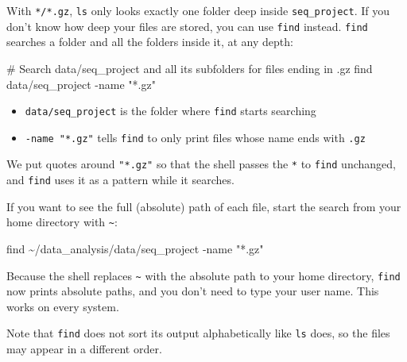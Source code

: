 \documentclass[
  letterpaper,
  DIV=11,
  numbers=noendperiod]{scrreprt}
\newenvironment{Shaded}{}{}
\newcommand{\AttributeTok}[1]{\textcolor[rgb]{0.84,0.23,0.29}{#1}}
\newcommand{\CommentTok}[1]{\textcolor[rgb]{0.42,0.45,0.49}{#1}}
\newcommand{\FunctionTok}[1]{\textcolor[rgb]{0.44,0.26,0.76}{#1}}
\newcommand{\NormalTok}[1]{\textcolor[rgb]{0.14,0.16,0.18}{#1}}
\newcommand{\StringTok}[1]{\textcolor[rgb]{0.01,0.18,0.38}{#1}}
\providecommand{\tightlist}{%
  \setlength{\itemsep}{0pt}\setlength{\parskip}{0pt}}
\begin{document}
\begin{tcolorbox}[enhanced jigsaw, coltitle=black, breakable, titlerule=0mm, colback=white, rightrule=.15mm, bottomrule=.15mm, toprule=.15mm, colframe=quarto-callout-tip-color-frame, colbacktitle=quarto-callout-tip-color!10!white, bottomtitle=1mm, opacitybacktitle=0.6, toptitle=1mm, leftrule=.75mm, arc=.35mm, title=\textcolor{quarto-callout-tip-color}{\faLightbulb}\hspace{0.5em}{Tip: Finding files with find (optional)}, left=2mm, opacityback=0]

With \texttt{*/*.gz}, \texttt{ls} only looks exactly one folder deep
inside \texttt{seq\_project}. If you don't know how deep your files are
stored, you can use \texttt{find} instead. \texttt{find} searches a
folder and all the folders inside it, at any depth:

\begin{Shaded}
\begin{Highlighting}[]
\CommentTok{\# Search data/seq\_project and all its subfolders for files ending in .gz}
\FunctionTok{find}\NormalTok{ data/seq\_project }\AttributeTok{{-}name} \StringTok{"*.gz"}
\end{Highlighting}
\end{Shaded}

\begin{itemize}
\tightlist
\item
  \texttt{data/seq\_project} is the folder where \texttt{find} starts
  searching
\item
  \texttt{-name\ "*.gz"} tells \texttt{find} to only print files whose
  name ends with \texttt{.gz}
\end{itemize}

We put quotes around \texttt{"*.gz"} so that the shell passes the
\texttt{*} to \texttt{find} unchanged, and \texttt{find} uses it as a
pattern while it searches.

If you want to see the full (absolute) path of each file, start the
search from your home directory with \texttt{\textasciitilde{}}:

\begin{Shaded}
\begin{Highlighting}[]
\FunctionTok{find}\NormalTok{ \textasciitilde{}/data\_analysis/data/seq\_project }\AttributeTok{{-}name} \StringTok{"*.gz"}
\end{Highlighting}
\end{Shaded}

Because the shell replaces \texttt{\textasciitilde{}} with the absolute
path to your home directory, \texttt{find} now prints absolute paths,
and you don't need to type your user name. This works on every system.

Note that \texttt{find} does not sort its output alphabetically like
\texttt{ls} does, so the files may appear in a different order.

\end{tcolorbox}
\end{document}
